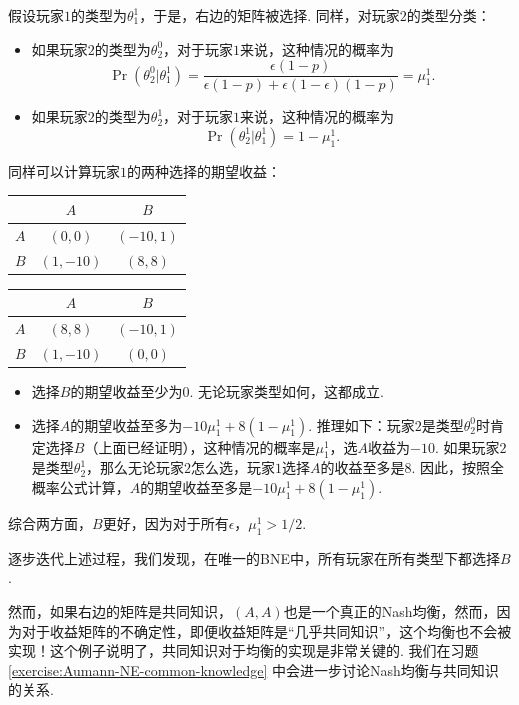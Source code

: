 假设玩家$1$的类型为$\theta_1^1$，于是，右边的矩阵被选择. 同样，对玩家$2$的类型分类：
\begin{itemize}
    \item 如果玩家$2$的类型为$\theta_2^0$，对于玩家$1$来说，这种情况的概率为
    \[\Pr(\theta_2^0|\theta_1^1) = \frac{\epsilon(1-p)}{\epsilon(1-p)+\epsilon(1-\epsilon)(1-p)} = \mu_1^1.\]
    \item 如果玩家$2$的类型为$\theta_2^1$，对于玩家$1$来说，这种情况的概率为
    \[\Pr(\theta_2^1|\theta_1^1) = 1 - \mu_1^1.\]
\end{itemize}
同样可以计算玩家$1$的两种选择的期望收益：
\begin{table}[ht]
    \centering
\begin{tabular}{c|cc}
&$A$ & $B$ \\
\hline
$A$ & $(0, 0)$ & $(-10, 1)$ \\
$B$ & $(1, -10)$ & $(8, 8)$ \\
\end{tabular}
\qquad
\begin{tabular}{c|cc}
&$A$ & $B$ \\
\hline
$A$ & $(8, 8)$ & $(-10, 1)$ \\
$B$ & $(1, -10)$ & $(0, 0)$ \\
\end{tabular}
\end{table}

\begin{itemize}
    \item 选择$B$的期望收益至少为$0$. 无论玩家类型如何，这都成立.
    \item 选择$A$的期望收益至多为$-10\mu_1^1 + 8(1 - \mu_1^1)$. 推理如下：玩家$2$是类型$\theta_2^0$时肯定选择$B$（上面已经证明），这种情况的概率是$\mu_1^1$，选$A$收益为$-10$. 如果玩家$2$是类型$\theta_2^1$，那么无论玩家$2$怎么选，玩家$1$选择$A$的收益至多是$8$. 因此，按照全概率公式计算，$A$的期望收益至多是$-10\mu_1^1 + 8(1 - \mu_1^1)$.
\end{itemize}

综合两方面，$B$更好，因为对于所有$\epsilon$，$\mu_1^1 > 1/2$. 

逐步迭代上述过程，我们发现，在唯一的BNE中，所有玩家在所有类型下都选择$B$. 

然而，如果右边的矩阵是共同知识，$(A,A)$也是一个真正的Nash均衡，然而，因为对于收益矩阵的不确定性，即便收益矩阵是“几乎共同知识”，这个均衡也不会被实现！这个例子说明了，共同知识对于均衡的实现是非常关键的. 我们在习题 \ref{exercise:Aumann-NE-common-knowledge} 中会进一步讨论Nash均衡与共同知识的关系.

